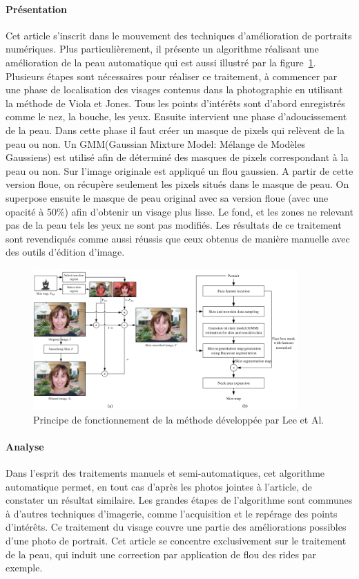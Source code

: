 \documentclass[11pt, french]{report-rd-info}
\begin{document}
\paragraph{Présentation}
Cet article s'inscrit dans le mouvement des techniques d'amélioration de portraits numériques.
Plus particulièrement, il présente un algorithme réalisant une amélioration de la peau automatique qui est aussi illustré par la figure~\ref{fig:FonctionnementLee}.
Plusieurs étapes sont nécessaires pour réaliser ce traitement, à commencer par une phase de localisation des visages contenus dans la photographie en utilisant la méthode de Viola et Jones.
Tous les points d'intérêts sont d'abord enregistrés comme le nez, la bouche, les yeux. 
Ensuite intervient une phase d'adoucissement de la peau.
Dans cette phase il faut créer un masque de pixels qui relèvent de la peau ou non.
Un GMM(Gaussian Mixture Model: Mélange de Modèles Gaussiens) est utilisé afin de déterminé des masques de pixels correspondant à la peau ou non. 
Sur l’image originale est appliqué un flou gaussien. A partir de cette version floue, on récupère seulement les pixels situés dans le masque de peau. On superpose ensuite le masque de peau original avec sa version floue (avec une opacité à 50\%) afin d’obtenir un visage plus lisse. Le fond, et les zones ne relevant pas de la peau tels les yeux ne sont pas modifiés. 
Les résultats de ce traitement sont revendiqués comme aussi réussis que ceux obtenus de manière manuelle avec des outils d'édition d'image.
\begin{figure}
	\centering
\includegraphics[width=0.9\textwidth]{Images/ea_algo_smoothing}
	\caption{Principe de fonctionnement de la méthode développée par Lee et Al.\cite{Lee}}
	\label{fig:FonctionnementLee}
\end{figure}

\paragraph{Analyse}
Dans l'esprit des traitements manuels et semi-automatiques, cet algorithme automatique permet, en tout cas d'après les photos jointes à l'article, de constater un résultat similaire.
Les grandes étapes de l'algorithme sont communes à d'autres techniques d'imagerie, comme l'acquisition et le repérage des points d'intérêts.
Ce traitement du visage couvre une partie des améliorations possibles d'une photo de portrait. Cet article se concentre exclusivement sur le traitement de la peau, qui induit une correction par application de flou des rides par exemple.
\end{document}
